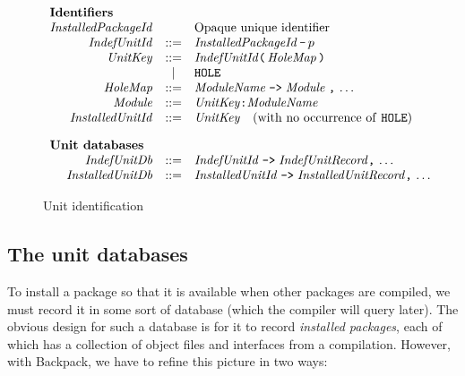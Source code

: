 \documentclass{article}
\newcommand{\I}[1]{\ensuremath{\mathit{#1}}}
\begin{document}
\begin{figure}[htpb]
$$
\begin{array}{rcll}
\multicolumn{3}{l}{\mbox{\bf Identifiers}} \\
  \I{InstalledPackageId} &  & \mbox{Opaque unique identifier} \\
  \I{IndefUnitId} & ::= & \I{InstalledPackageId}\, \verb|-|\, p  \\
  \I{UnitKey} & ::= & \I{IndefUnitId} \verb|(|\, \I{HoleMap}\, \verb|)|  \\
              & | & \verb|HOLE| \\
  \I{HoleMap} & ::= & \I{ModuleName}\; \verb|->|\; \I{Module}\; \verb|,|\, \ldots \\
  \I{Module} & ::= & \I{UnitKey} \verb|:| \I{ModuleName}  \\
  \I{InstalledUnitId} & ::= & \I{UnitKey} \quad \mbox{(with no occurrence of \texttt{HOLE})} \\[1em]
\multicolumn{3}{l}{\mbox{\bf Unit databases}} \\
  \I{IndefUnitDb} & ::= & \I{IndefUnitId} \; \verb|->| \; \I{IndefUnitRecord} \verb|,|\, \ldots \\
  \I{InstalledUnitDb} & ::= & \I{InstalledUnitId} \; \verb|->| \; \I{InstalledUnitRecord} \verb|,|\, \ldots \\
\end{array}
$$
\caption{Unit identification} \label{fig:ids}
\end{figure}

\subsection{The unit databases}

To install a package so that it is available when other packages are compiled,
we must record it in some sort of database (which the compiler will query later).
The obvious design for such a database is for it to record \emph{installed packages},
each of which has a collection of object files and interfaces from a compilation.
However, with Backpack, we have to refine this picture in two ways:
\end{document}
